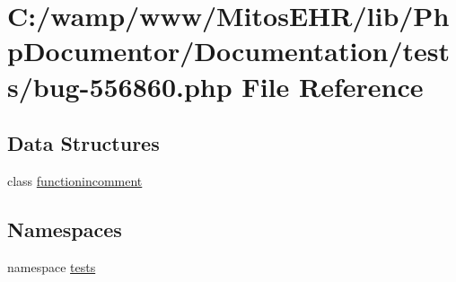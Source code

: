 \hypertarget{bug-556860_8php}{\section{\-C\-:/wamp/www/\-Mitos\-E\-H\-R/lib/\-Php\-Documentor/\-Documentation/tests/bug-\/556860.php \-File \-Reference}
\label{bug-556860_8php}
}
\subsection*{\-Data \-Structures}
\begin{DoxyCompactItemize}
\item 
class \hyperlink{classfunctionincomment}{functionincomment}
\end{DoxyCompactItemize}
\subsection*{\-Namespaces}
\begin{DoxyCompactItemize}
\item 
namespace \hyperlink{namespacetests}{tests}
\end{DoxyCompactItemize}
